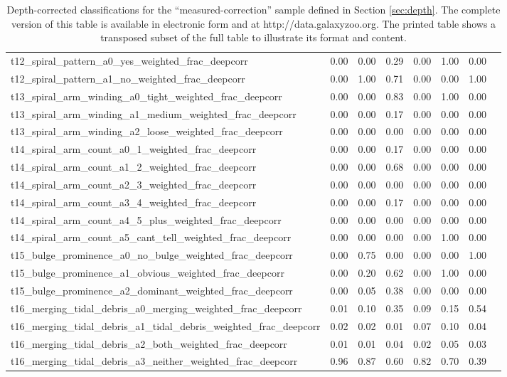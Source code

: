 \begin{table*}
{\begin{tabular}{@{}lccccccc}
t12\_spiral\_pattern\_a0\_yes\_weighted\_frac\_deepcorr & 0.00 & 0.00 & 0.29 & 0.00 & 1.00 & 0.00 & \\
t12\_spiral\_pattern\_a1\_no\_weighted\_frac\_deepcorr & 0.00 & 1.00 & 0.71 & 0.00 & 0.00 & 1.00 & \\
t13\_spiral\_arm\_winding\_a0\_tight\_weighted\_frac\_deepcorr & 0.00 & 0.00 & 0.83 & 0.00 & 1.00 & 0.00 & \\
t13\_spiral\_arm\_winding\_a1\_medium\_weighted\_frac\_deepcorr & 0.00 & 0.00 & 0.17 & 0.00 & 0.00 & 0.00 & \\
t13\_spiral\_arm\_winding\_a2\_loose\_weighted\_frac\_deepcorr & 0.00 & 0.00 & 0.00 & 0.00 & 0.00 & 0.00 & \\
t14\_spiral\_arm\_count\_a0\_1\_weighted\_frac\_deepcorr & 0.00 & 0.00 & 0.17 & 0.00 & 0.00 & 0.00 & \\
t14\_spiral\_arm\_count\_a1\_2\_weighted\_frac\_deepcorr & 0.00 & 0.00 & 0.68 & 0.00 & 0.00 & 0.00 & \\
t14\_spiral\_arm\_count\_a2\_3\_weighted\_frac\_deepcorr & 0.00 & 0.00 & 0.00 & 0.00 & 0.00 & 0.00 & \\
t14\_spiral\_arm\_count\_a3\_4\_weighted\_frac\_deepcorr & 0.00 & 0.00 & 0.17 & 0.00 & 0.00 & 0.00 & \\
t14\_spiral\_arm\_count\_a4\_5\_plus\_weighted\_frac\_deepcorr & 0.00 & 0.00 & 0.00 & 0.00 & 0.00 & 0.00 & \\
t14\_spiral\_arm\_count\_a5\_cant\_tell\_weighted\_frac\_deepcorr & 0.00 & 0.00 & 0.00 & 0.00 & 1.00 & 0.00 & \\
t15\_bulge\_prominence\_a0\_no\_bulge\_weighted\_frac\_deepcorr & 0.00 & 0.75 & 0.00 & 0.00 & 0.00 & 1.00 & \\
t15\_bulge\_prominence\_a1\_obvious\_weighted\_frac\_deepcorr & 0.00 & 0.20 & 0.62 & 0.00 & 1.00 & 0.00 & \\
t15\_bulge\_prominence\_a2\_dominant\_weighted\_frac\_deepcorr & 0.00 & 0.05 & 0.38 & 0.00 & 0.00 & 0.00 & \\
t16\_merging\_tidal\_debris\_a0\_merging\_weighted\_frac\_deepcorr & 0.01 & 0.10 & 0.35 & 0.09 & 0.15 & 0.54 & \\
t16\_merging\_tidal\_debris\_a1\_tidal\_debris\_weighted\_frac\_deepcorr & 0.02 & 0.02 & 0.01 & 0.07 & 0.10 & 0.04 & \\
t16\_merging\_tidal\_debris\_a2\_both\_weighted\_frac\_deepcorr & 0.01 & 0.01 & 0.04 & 0.02 & 0.05 & 0.03 & \\
t16\_merging\_tidal\_debris\_a3\_neither\_weighted\_frac\_deepcorr & 0.96 & 0.87 & 0.60 & 0.82 & 0.70 & 0.39 & \\
\hline
\end{tabular}}
\caption{Depth-corrected classifications for the ``measured-correction'' sample defined in Section \ref{sec:depth}. The complete version of this table is available in electronic form and at http://data.galaxyzoo.org. The printed table shows a transposed subset of the full table to illustrate its format and content.}
\label{table:data-depthcorr}
\end{table*}

